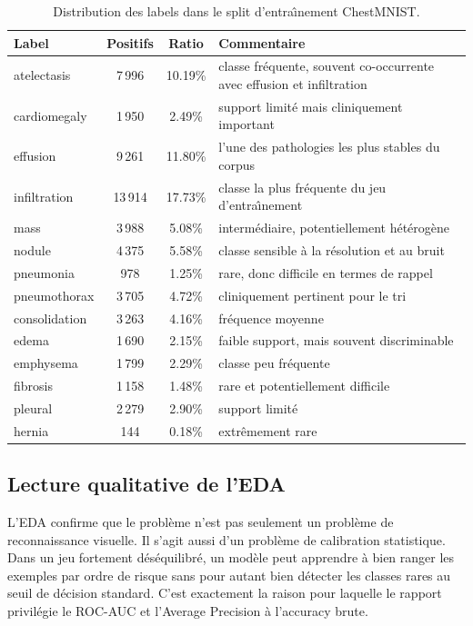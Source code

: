 \documentclass[11pt,a4paper]{article}
\begin{document}
\begin{table}[H]
    \centering
    \caption{Distribution des labels dans le split d'entra\^\i nement ChestMNIST.}
    \small
    \begin{tabular}{p{3.2cm}c c p{4.5cm}}
        \toprule
        Label & Positifs & Ratio & Commentaire \\
        \midrule
        atelectasis & 7\,996 & 10.19\% & classe fr\'equente, souvent co-occurrente avec effusion et infiltration \\
        cardiomegaly & 1\,950 & 2.49\% & support limit\'e mais cliniquement important \\
        effusion & 9\,261 & 11.80\% & l'une des pathologies les plus stables du corpus \\
        infiltration & 13\,914 & 17.73\% & classe la plus fr\'equente du jeu d'entra\^\i nement \\
        mass & 3\,988 & 5.08\% & interm\'ediaire, potentiellement h\'et\'erog\`ene \\
        nodule & 4\,375 & 5.58\% & classe sensible \`a la r\'esolution et au bruit \\
        pneumonia & 978 & 1.25\% & rare, donc difficile en termes de rappel \\
        pneumothorax & 3\,705 & 4.72\% & cliniquement pertinent pour le tri \\
        consolidation & 3\,263 & 4.16\% & fr\'equence moyenne \\
        edema & 1\,690 & 2.15\% & faible support, mais souvent discriminable \\
        emphysema & 1\,799 & 2.29\% & classe peu fr\'equente \\
        fibrosis & 1\,158 & 1.48\% & rare et potentiellement difficile \\
        pleural & 2\,279 & 2.90\% & support limit\'e \\
        hernia & 144 & 0.18\% & extr\^emement rare \\
        \bottomrule
    \end{tabular}
\end{table}

\subsection{Lecture qualitative de l'EDA}
L'EDA confirme que le probl\`eme n'est pas seulement un probl\`eme de reconnaissance visuelle. Il s'agit aussi d'un probl\`eme de calibration statistique. Dans un jeu fortement d\'es\'equilibr\'e, un mod\`ele peut apprendre \`a bien ranger les exemples par ordre de risque sans pour autant bien d\'etecter les classes rares au seuil de d\'ecision standard. C'est exactement la raison pour laquelle le rapport privil\'egie le ROC-AUC et l'Average Precision \`a l'accuracy brute.
\end{document}
